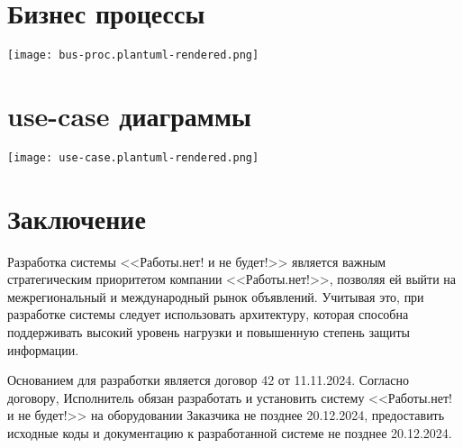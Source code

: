 \documentclass[a4page]{article}
\begin{document}
\newpage
\section{Бизнес процессы}

\texttt{[image: bus-proc.plantuml-rendered.png]}

\newpage
\section{use-case диаграммы}


\texttt{[image: use-case.plantuml-rendered.png]}

\newpage
\section{Заключение}

Разработка системы <<Работы.нет! и не будет!>> является важным стратегическим приоритетом компании <<Работы.нет!>>,
позволяя ей выйти на межрегиональный и международный рынок объявлений. 
Учитывая это, при разработке системы следует использовать архитектуру, которая способна поддерживать высокий уровень нагрузки
и повышенную степень защиты информации.

Основанием для разработки является договор 42 от 11.11.2024. 
Согласно договору, Исполнитель обязан разработать и установить систему <<Работы.нет! и не будет!>> на оборудовании Заказчика не позднее 20.12.2024,
предоставить исходные коды и документацию к разработанной системе не позднее 20.12.2024.
\end{document}
